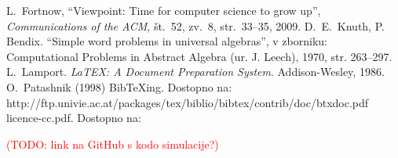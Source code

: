 \documentclass[a4paper, 12pt]{book}
\newcommand{\BibTeX}{{\sc Bib}\TeX}
\newcommand{\TODO}[1]{\textcolor{red}{(TODO: #1)}}
\begin{document}
\begin{thebibliography}{99}
\label{bibliografija}

 L.\ Fortnow, ``Viewpoint: Time for computer science to grow up'',
{\it Communications of the ACM}, št.\ 52, zv.\ 8, str.\ 33--35, 2009.
 D.\ E.\ Knuth, P. Bendix. ``Simple word problems in universal algebras'', v zborniku: Computational Problems in Abstract Algebra (ur. J. Leech), 1970, str. 263--297.
 L.\ Lamport. {\it LaTEX: A Document Preparation System}. Addison-Wesley, 1986.
 O.\ Patashnik (1998) \BibTeX{}ing. 
Dostopno na:\\ http://ftp.univie.ac.at/packages/tex/biblio/bibtex/contrib/doc/btxdoc.pdf
 licence-cc.pdf. Dostopno na: 

 \TODO{link na GitHub s kodo simulacije?}

\end{thebibliography}
\end{document}
